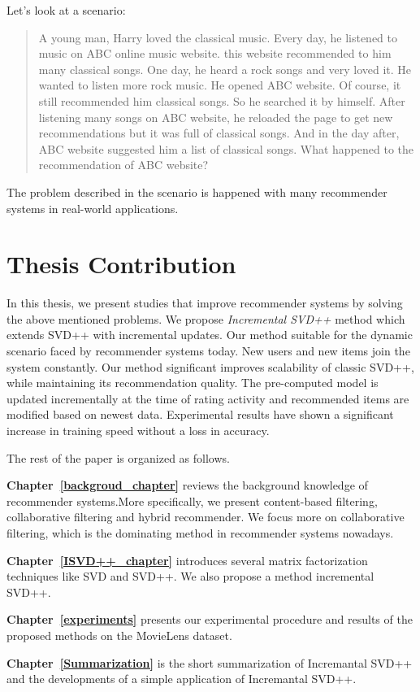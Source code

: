 \documentclass[oneside,13pt]{extreport}
\begin{document}
Let's look at a scenario: 
\begin{quote}
A young man, Harry loved the classical music. Every day, he listened to music on ABC online music website. this website recommended to him many classical songs. One day, he heard a rock songs and very loved it. He wanted to listen more rock music. He opened ABC website. Of course, it still recommended him classical songs. So he searched it by himself. After listening many songs on ABC website, he reloaded the page to get new recommendations but it was full of classical songs. And in the day after, ABC website suggested him a list of classical songs. What happened to the recommendation of ABC website?
\end{quote}
The problem described in the scenario is happened with many recommender systems in real-world applications. 
\section{Thesis Contribution}
In this thesis, we present studies that improve recommender systems by solving the above mentioned problems. We propose \emph{Incremental SVD++} method which extends SVD++ with incremental updates. Our method suitable for the dynamic scenario faced by recommender systems today. New users and new items join the system constantly. Our method significant improves scalability of classic SVD++, while maintaining its recommendation quality. The pre-computed model is updated incrementally at the time of rating activity and recommended items are modified based on newest data. Experimental results have shown a significant increase in training speed without a loss in accuracy.

The rest of the paper is organized as follows.
\begin{description}
    \item{\textbf{Chapter~\ref{backgroud_chapter}}} reviews the background knowledge of recommender systems.More specifically, we present content-based filtering, collaborative filtering and hybrid recommender. We focus more on collaborative filtering, which is the dominating method in recommender systems nowadays.
    \item{\textbf{Chapter~\ref{ISVD++_chapter}}} introduces several matrix factorization techniques like SVD and SVD++. We also propose a method incremental SVD++. 
	\item{\textbf{Chapter~\ref{experiments}}} presents our experimental procedure and results of the proposed methods on the MovieLens dataset. 
    \item{\textbf{Chapter~\ref{Summarization}}} is the short summarization of Incremantal SVD++ and the developments of a simple application of Incremantal SVD++.
    
\end{description}
\end{document}
